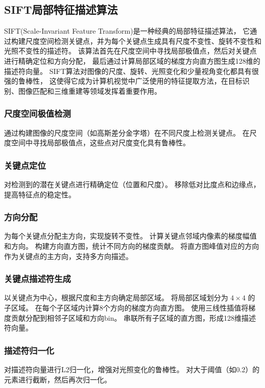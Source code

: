 \subsection{SIFT局部特征描述算法}
SIFT(Scale-Invariant Feature Transform)是一种经典的局部特征描述算法，
它通过构建尺度空间检测关键点，并为每个关键点生成具有尺度不变性、旋转不变性和光照不变性的描述符。
该算法首先在尺度空间中寻找局部极值点，然后对关键点进行精确定位和方向分配，
最后通过计算局部区域的梯度方向直方图生成128维的描述符向量。
SIFT算法对图像的尺度、旋转、光照变化和少量视角变化都具有很强的鲁棒性，
这使得它成为计算机视觉中广泛使用的特征提取方法，在目标识别、图像匹配和三维重建等领域发挥着重要作用。

\subsubsection{尺度空间极值检测}
通过构建图像的尺度空间（如高斯差分金字塔）在不同尺度上检测关键点。
在尺度空间中寻找局部极值点，这些点对尺度变化具有鲁棒性。

\subsubsection{关键点定位}
对检测到的潜在关键点进行精确定位（位置和尺度）。
移除低对比度点和边缘点，提高特征点的稳定性。

\subsubsection{方向分配}
为每个关键点分配主方向，实现旋转不变性。
计算关键点邻域内像素的梯度幅值和方向。
构建方向直方图，统计不同方向的梯度贡献。
将直方图峰值对应的方向作为关键点的主方向，支持多方向描述。

\subsubsection{关键点描述符生成}
以关键点为中心，根据尺度和主方向确定局部区域。
将局部区域划分为 \(4 \times 4\) 的子区域。
在每个子区域内计算8个方向的梯度方向直方图。
使用三线性插值将梯度贡献分配到相邻子区域和方向bin。
串联所有子区域的直方图，形成128维描述符向量。

\subsubsection{描述符归一化}
对描述符向量进行L2归一化，增强对光照变化的鲁棒性。
对大于阈值（如0.2）的元素进行截断，然后再次归一化。
